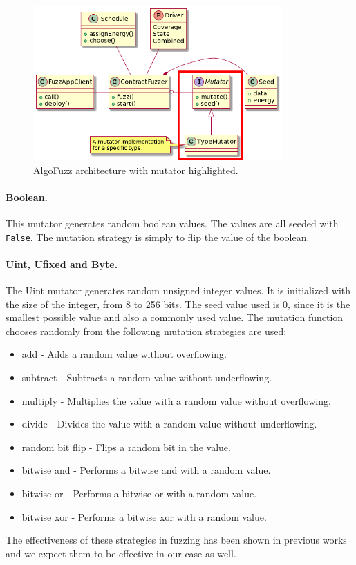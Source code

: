 \begin{figure}[htbp]
    \centering
    \includegraphics[width=0.85\textwidth]{figures/arc-mutator-r.png}
    \caption{AlgoFuzz architecture with mutator highlighted.}\label{fig:architecture-mutator}
\end{figure}

\paragraph{Boolean.} This mutator generates random boolean values. The values are all seeded with \texttt{False}.
The mutation strategy is simply to flip the value of the boolean.

\paragraph{Uint, Ufixed and Byte.}
The Uint mutator generates random unsigned integer values. It is initialized with the size of the integer, from 8 to 256 bits. The seed value used is 0, since it is the smallest possible value and also a commonly used value. The mutation function chooses randomly from the following mutation strategies are used:
\begin{itemize}
    \item add - Adds a random value without overflowing.
    \item subtract - Subtracts a random value without underflowing.
    \item multiply - Multiplies the value with a random value without overflowing.
    \item divide - Divides the value with a random value without underflowing.
    \item random bit flip - Flips a random bit in the value.
    \item bitwise and - Performs a bitwise and with a random value.
    \item bitwise or - Performs a bitwise or with a random value.
    \item bitwise xor - Performs a bitwise xor with a random value.
\end{itemize}
The effectiveness of these strategies in fuzzing has been shown in previous works and we expect them to be effective in our case as well.

